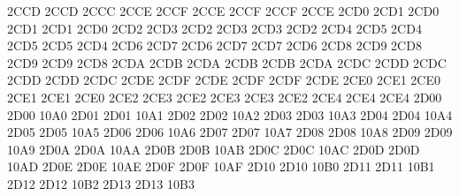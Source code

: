 \setcclcucx 2CCD 2CCD 2CCC %
\setcclcucx 2CCE 2CCF 2CCE %
\setcclcucx 2CCF 2CCF 2CCE %
\setcclcucx 2CD0 2CD1 2CD0 %
\setcclcucx 2CD1 2CD1 2CD0 %
\setcclcucx 2CD2 2CD3 2CD2 %
\setcclcucx 2CD3 2CD3 2CD2 %
\setcclcucx 2CD4 2CD5 2CD4 %
\setcclcucx 2CD5 2CD5 2CD4 %
\setcclcucx 2CD6 2CD7 2CD6 %
\setcclcucx 2CD7 2CD7 2CD6 %
\setcclcucx 2CD8 2CD9 2CD8 %
\setcclcucx 2CD9 2CD9 2CD8 %
\setcclcucx 2CDA 2CDB 2CDA %
\setcclcucx 2CDB 2CDB 2CDA %
\setcclcucx 2CDC 2CDD 2CDC %
\setcclcucx 2CDD 2CDD 2CDC %
\setcclcucx 2CDE 2CDF 2CDE %
\setcclcucx 2CDF 2CDF 2CDE %
\setcclcucx 2CE0 2CE1 2CE0 %
\setcclcucx 2CE1 2CE1 2CE0 %
\setcclcucx 2CE2 2CE3 2CE2 %
\setcclcucx 2CE3 2CE3 2CE2 %
\setcclcucx 2CE4 2CE4 2CE4 %
\setcclcucx 2D00 2D00 10A0 %
\setcclcucx 2D01 2D01 10A1 %
\setcclcucx 2D02 2D02 10A2 %
\setcclcucx 2D03 2D03 10A3 %
\setcclcucx 2D04 2D04 10A4 %
\setcclcucx 2D05 2D05 10A5 %
\setcclcucx 2D06 2D06 10A6 %
\setcclcucx 2D07 2D07 10A7 %
\setcclcucx 2D08 2D08 10A8 %
\setcclcucx 2D09 2D09 10A9 %
\setcclcucx 2D0A 2D0A 10AA %
\setcclcucx 2D0B 2D0B 10AB %
\setcclcucx 2D0C 2D0C 10AC %
\setcclcucx 2D0D 2D0D 10AD %
\setcclcucx 2D0E 2D0E 10AE %
\setcclcucx 2D0F 2D0F 10AF %
\setcclcucx 2D10 2D10 10B0 %
\setcclcucx 2D11 2D11 10B1 %
\setcclcucx 2D12 2D12 10B2 %
\setcclcucx 2D13 2D13 10B3 %
